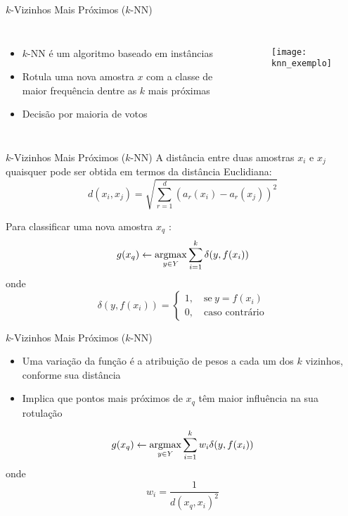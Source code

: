 \begin{frame}{$k$-Vizinhos Mais Próximos ($k$-NN)}
\begin{columns}
\begin{itemize}
    \item $k$-NN é um algoritmo baseado em instâncias
    \item Rotula uma nova amostra $x$ com a classe de maior frequência dentre as $k$ mais próximas
    \item Decisão por maioria de votos \citep{duda:12}
\end{itemize}

\begin{figure}[!h]
  \centering
  \texttt{[image: knn\_exemplo]}
\end{figure}
\end{columns}

\end{frame}

\begin{frame}{$k$-Vizinhos Mais Próximos ($k$-NN)}
A distância entre duas amostras $x_i$ e $x_j$ quaisquer pode ser obtida em termos da distância Euclidiana:
\begin{equation*}
\label{eq:knn_distancia_euclidiana}
d(x_i, x_j) = \sqrt{\sum_{r=1}^d (a_r(x_i) - a_r(x_j))^2}
\end{equation*}

Para classificar uma nova amostra $x_q$ \citep{mitchell:97}:
\begin{equation*}
\label{eq:knn_funcao_argmax}
g(x_q) \gets \operatorname*{argmax}_{y \in Y} \sum_{i=1}^k \delta (y, f(x_i))
\end{equation*}
\noindent onde
\begin{equation*}
\label{eq:knn_delta}
  \delta (y, f(x_i)) =  \begin{cases}
                1, \quad \text{se}\ y = f(x_i) \\
                0, \quad \text{caso contrário}
              \end{cases}
\end{equation*}
\end{frame}

\begin{frame}{$k$-Vizinhos Mais Próximos ($k$-NN)}
\begin{itemize}
    \item Uma variação da função é a atribuição de pesos a cada um dos $k$ vizinhos, conforme sua distância
    \item Implica que pontos mais próximos de $x_q$ têm maior influência na sua rotulação
\end{itemize}
\begin{equation*}
g(x_q) \gets \operatorname*{argmax}_{y \in Y} \sum_{i=1}^k w_i \delta (y, f(x_i))
\end{equation*}
\noindent onde
\begin{equation*}
  w_i = \frac{1}{d(x_q, x_i)^2}
\end{equation*}

\end{frame}

